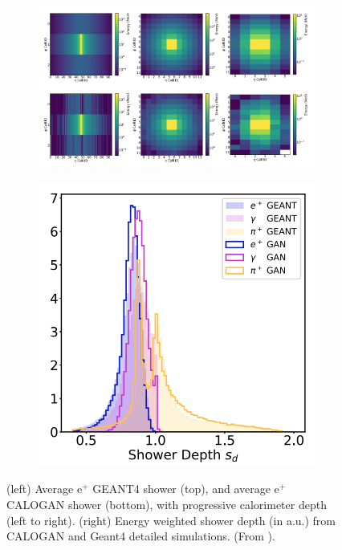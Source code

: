 \begin{figure}[h]
    \centering
    \begin{subfigure}[b]{0.55\textwidth}
    \centering
    \includegraphics[width=1\textwidth]{images/calogan1.png}
    \end{subfigure}
    \hfill
        \begin{subfigure}[b]{0.44\textwidth}
        \includegraphics[width=1\textwidth]{images/calogan2.png}
        \end{subfigure}
\caption{(left) Average e$^+$ GEANT4 shower (top), and average e$^+$
CALOGAN shower (bottom), with progressive calorimeter depth
(left to right). (right) Energy weighted shower depth (in a.u.) from CALOGAN and Geant4 detailed simulations. (From \cite{calogan}).}
        \label{fig:calogan}
\end{figure}


